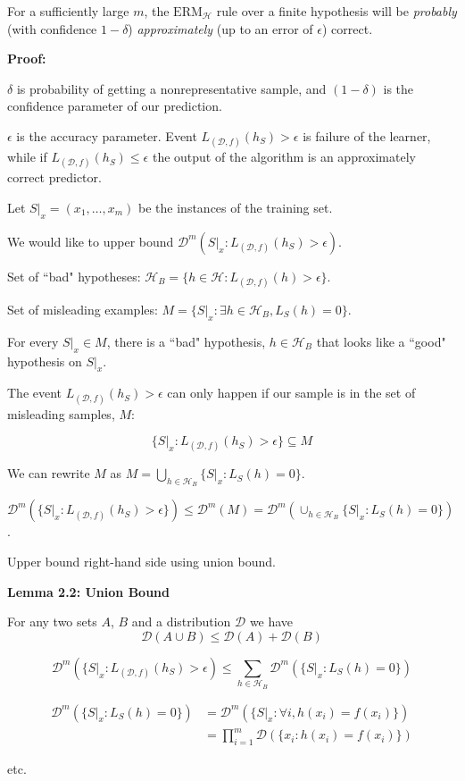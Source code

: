 \medskip

For a sufficiently large $m$, the $\text{ERM}_\mathcal{H}$ rule over a finite hypothesis will be \textit{probably} (with confidence $1-\delta$) \textit{approximately} (up to an error of $\epsilon$) correct.

\medskip

\textbf{Proof:}

$\delta$ is probability of getting a nonrepresentative sample, and $(1-\delta)$ is the confidence parameter of our prediction.

$\epsilon$ is the accuracy parameter. Event $L_{(\mathcal{D}, f)}(h_S) > \epsilon$ is failure of the learner, while if $L_{(\mathcal{D}, f)}(h_S) \leq \epsilon$ the output of the algorithm is an approximately correct predictor.

\bigskip

Let $S|_x = (x_1, \dots, x_m)$ be the instances of the training set.

We would like to upper bound $\mathcal{D}^m({S|_x : L_{(\mathcal{D}, f)}(h_S) > \epsilon})$.

Set of ``bad" hypotheses: $\mathcal{H}_B = \{ h \in \mathcal{H} : L_{(\mathcal{D}, f)}(h) > \epsilon \}$.

Set of misleading examples: $M = \{S|_x : \exists h \in \mathcal{H}_B, L_S(h) = 0\}$.

For every $S|_x \in M$, there is a ``bad" hypothesis, $h \in \mathcal{H}_B$ that looks like a ``good" hypothesis on $S|_x$.

The event $L_{(\mathcal{D}, f)} (h_S) > \epsilon$ can only happen if our sample is in the set of misleading samples, $M$: 

$$\{ S |_x : L_{(\mathcal{D}, f)} (h_S) > \epsilon \} \subseteq M$$

We can rewrite $M$ as $M = \bigcup_{h \in \mathcal{H}_B} \{S |_x : L_S(h) = 0\}$.

$\mathcal{D}^m(\{S |_x : L_{(\mathcal{D}, f)} (h_S) > \epsilon \}) \leq \mathcal{D}^m (M) = \mathcal{D}^m (\cup_{h \in \mathcal{H}_B} \{S |_x : L_S(h) = 0 \})$.

Upper bound right-hand side using union bound.

\bigskip

\textbf{Lemma 2.2: Union Bound}

For any two sets $A$, $B$ and a distribution $\mathcal{D}$ we have
    $$\mathcal{D}(A \cup B) \leq \mathcal{D}(A) + \mathcal{D}(B)$$

$$\mathcal{D}^m(\{S |_x : L_{(\mathcal{D}, f)} (h_S) > \epsilon) \leq \sum_{h \in \mathcal{H}_B} \mathcal{D}^m ( \{ S|_x : L_S(h) = 0 \})$$

\begin{equation*}
    \begin{aligned}
        \mathcal{D}^m (\{S |_x : L_S(h) = 0 \}) 
        &= \mathcal{D}^m(\{S|_x : \forall i, h(x_i) = f(x_i) \}) \\
        &= \prod_{i=1}^m \mathcal{D}(\{x_i : h(x_i) = f(x_i) \})
    \end{aligned}
\end{equation*}

etc.
